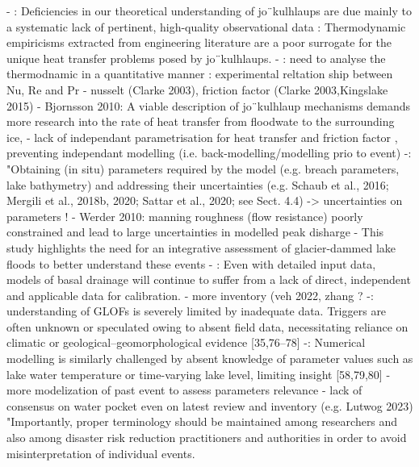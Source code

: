     

    - \cite{Roberts2005}: Deficiencies in our theoretical understanding of
jo¨kulhlaups are due mainly to a systematic lack of pertinent,
high-quality observational data
\cite{Roberts2005}: Thermodynamic empiricisms extracted from engineering
literature are a poor surrogate for the unique heat transfer
problems posed by jo¨kulhlaups.
    - \cite{Roberts2005}: need to analyse the thermodnamic in a quantitative manner : experimental reltation ship between Nu, Re and Pr
    - nusselt (Clarke 2003), friction factor (Clarke 2003,Kingslake 2015)
    - Bjornsson 2010: A viable description of jo¨kulhlaup mechanisms demands more research into the rate of heat transfer from floodwate to the surrounding ice,
    - lack of independant parametrisation for heat transfer  \cite{Vincent&al2010} and friction factor \cite{Werder&al2010}, preventing independant modelling (i.e. back-modelling/modelling prio to event)
    -\cite{Emmer&al2022}: "Obtaining (in situ) parameters required by the model (e.g. breach parameters, lake bathymetry) and addressing their uncertainties (e.g. Schaub et al., 2016; Mergili et al., 2018b, 2020; Sattar et al., 2020; see Sect. 4.4) -> uncertainties on parameters !
    - Werder 2010: manning roughness (flow resistance) poorly constrained and lead to large uncertainties in modelled peak disharge
    -  This study highlights the need for an integrative assessment of glacier-dammed lake floods to better understand these events \citep{Huss&al2007}
    - \cite{Flowers2015}: Even with detailed input data, models of basal drainage will continue to suffer from a lack of direct, independent and applicable data for calibration.
    - more inventory (veh 2022, zhang ? 
    -\citep{Zhang&al2024}: understanding of GLOFs is severely limited by inadequate data. Triggers are often unknown or speculated owing to absent field data, necessitating reliance on climatic or geological–geomorphological evidence [35,76–78]
    -\citep{Zhang&al2024}: Numerical modelling is similarly challenged by absent knowledge of parameter values such as lake water temperature or time-varying lake level, limiting insight [58,79,80]
    - more modelization of past event to assess parameters relevance
    - lack of consensus on water pocket even on latest review and inventory (e.g. Lutwog 2023)
    \cite{Emmer&al2022} "Importantly, proper terminology should be maintained among researchers and also among disaster risk reduction practitioners and authorities in order to avoid misinterpretation of individual events.
